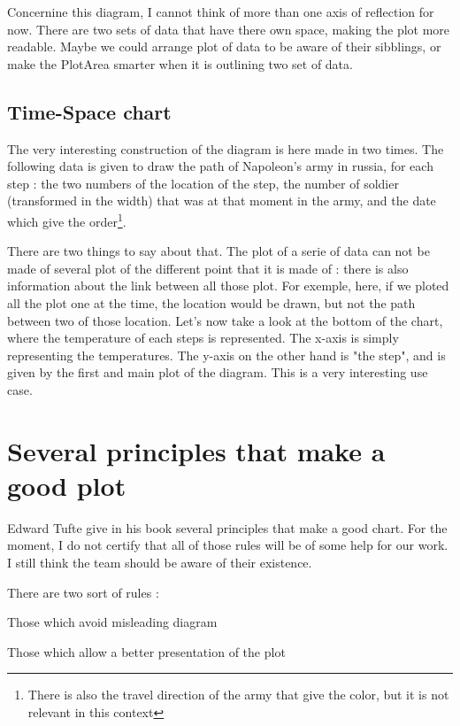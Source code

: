 Concernine this diagram, I cannot think of more than one axis of reflection for now. There are two sets of data that have there own space, making the plot more readable. Maybe we could arrange plot of data to be aware of their sibblings, or make the PlotArea smarter when it is outlining two set of data.


\subsection{Time-Space chart}
The very interesting construction of the diagram is here made in two times. The following data is given to draw the path of Napoleon's army in russia, for each step : the two numbers of the location of the step, the number of soldier (transformed in the width) that was at that moment in the army, and the date which give the order\footnote{There is also the travel direction of the army that give the color, but it is not relevant in this context}.

There are two things to say about that. The plot of a serie of data can not be made of several plot of the different point that it is made of : there is also information about the link between all those plot. For exemple, here, if we ploted all the plot one at the time, the location would be drawn, but not the path between two of those location.
Let's now take a look at the bottom of the chart, where the temperature of each steps is represented. The x-axis is simply representing the temperatures. The y-axis on the other hand is "the step", and is given by the first and main plot of the diagram. This is a very interesting use case.

\section{Several principles that make a good plot}
Edward Tufte give in his book several principles that make a good chart. For the moment, I do not certify that all of those rules will be of some help for our work. I still think the team should be aware of their existence.

There are two sort of rules :
\begin{enum}
\item Those which avoid misleading diagram  
\item Those which allow a better presentation of the plot
\end{enum}

